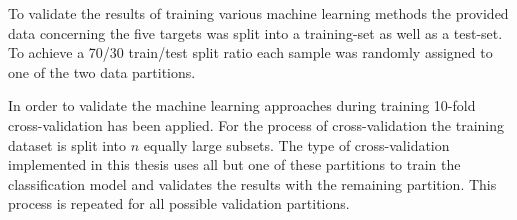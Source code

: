 To validate the results of training various machine learning methods the provided data concerning
the five targets was split into a training-set as well as a test-set. To achieve a 70/30 train/test split ratio each sample was randomly assigned 
to one of the two data partitions\cite[]{Xu2018}.

In order to validate the machine learning approaches during training 10-fold cross-validation has been applied.
For the process of cross-validation the training dataset is split into $n$ equally large subsets.
The type of cross-validation implemented in this thesis uses all but one of these partitions to train the classification model and validates the 
results with the remaining partition. This process is repeated for all possible validation partitions\cite[]{Molinaro2005}.